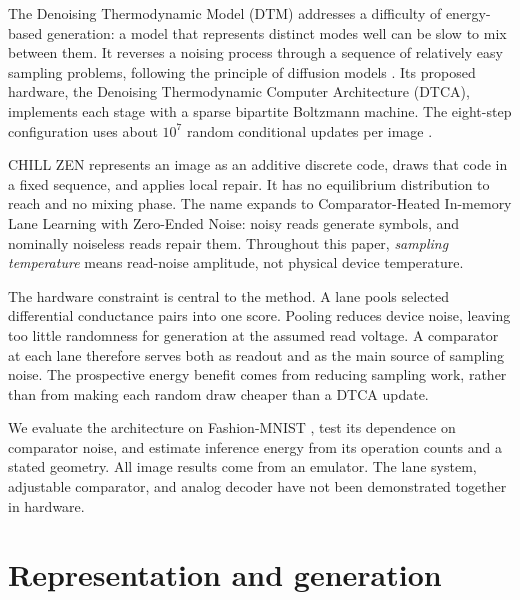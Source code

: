 \documentclass[reprint,amsmath,amssymb,aps,pra,floatfix,nofootinbib]{revtex4-2}
\begin{document}
The Denoising Thermodynamic Model (DTM) addresses a difficulty of energy-based generation: a model that represents distinct modes well can be slow to mix between them. It reverses a noising process through a sequence of relatively easy sampling problems, following the principle of diffusion models \cite{sohldickstein2015deep,ho2020ddpm}. Its proposed hardware, the Denoising Thermodynamic Computer Architecture (DTCA), implements each stage with a sparse bipartite Boltzmann machine. The eight-step configuration uses about $10^7$ random conditional updates per image \cite{jelincic2025dtm}.

CHILL ZEN represents an image as an additive discrete code, draws that code in a fixed sequence, and applies local repair. It has no equilibrium distribution to reach and no mixing phase. The name expands to Comparator-Heated In-memory Lane Learning with Zero-Ended Noise: noisy reads generate symbols, and nominally noiseless reads repair them. Throughout this paper, \emph{sampling temperature} means read-noise amplitude, not physical device temperature.

The hardware constraint is central to the method. A lane pools selected differential conductance pairs into one score. Pooling reduces device noise, leaving too little randomness for generation at the assumed read voltage. A comparator at each lane therefore serves both as readout and as the main source of sampling noise. The prospective energy benefit comes from reducing sampling work, rather than from making each random draw cheaper than a DTCA update.

We evaluate the architecture on Fashion-MNIST \cite{xiao2017fashion}, test its dependence on comparator noise, and estimate inference energy from its operation counts and a stated geometry. All image results come from an emulator. The lane system, adjustable comparator, and analog decoder have not been demonstrated together in hardware.

\section{Representation and generation}\label{sec:method}
\end{document}
